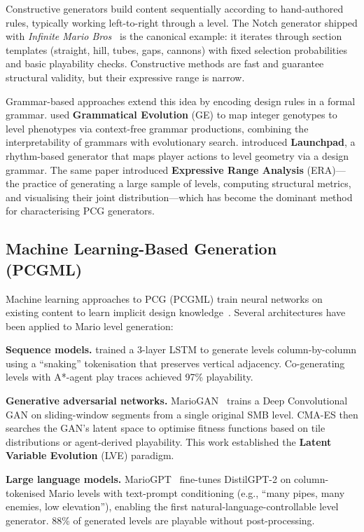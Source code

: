 \documentclass[shortabstract, mgr, english]{iithesis}
\begin{document}
Constructive generators build content sequentially according to hand-authored
rules, typically working left-to-right through a level. The Notch generator
shipped with \emph{Infinite Mario
Bros}~\citep{karakovskiy2012marioai} is the canonical example: it iterates
through section templates (straight, hill, tubes, gaps, cannons) with fixed
selection probabilities and basic playability checks. Constructive methods are
fast and guarantee structural validity, but their expressive range is narrow.

Grammar-based approaches extend this idea by encoding design rules in a formal
grammar. \citet{shaker2012evolving} used \textbf{Grammatical Evolution} (GE) to
map integer genotypes to level phenotypes via context-free grammar productions,
combining the interpretability of grammars with evolutionary search.
\citet{smith2010analyzing} introduced \textbf{Launchpad}, a rhythm-based
generator that maps player actions to level geometry via a design grammar. The
same paper introduced \textbf{Expressive Range Analysis} (ERA)---the practice of
generating a large sample of levels, computing structural metrics, and
visualising their joint distribution---which has become the dominant method for
characterising PCG generators.

\subsection{Machine Learning-Based Generation (PCGML)}
\label{subsec:bg-pcgml}

Machine learning approaches to PCG (PCGML) train neural networks on existing
content to learn implicit design knowledge~\citep{summerville2018pcgml}. Several
architectures have been applied to Mario level generation:

\textbf{Sequence models.} \citet{summerville2016super} trained a 3-layer LSTM to
generate levels column-by-column using a ``snaking'' tokenisation that preserves
vertical adjacency. Co-generating levels with A*-agent play traces achieved
97\% playability.

\textbf{Generative adversarial networks.} MarioGAN~\citep{volz2018evolving}
trains a Deep Convolutional GAN on sliding-window segments from a single
original SMB level. CMA-ES then searches the GAN's latent space to optimise
fitness functions based on tile distributions or agent-derived playability. This
work established the \textbf{Latent Variable Evolution} (LVE) paradigm.

\textbf{Large language models.} MarioGPT~\citep{sudhakaran2023mariogpt}
fine-tunes DistilGPT-2 on column-tokenised Mario levels with text-prompt
conditioning (e.g., ``many pipes, many enemies, low elevation''), enabling the
first natural-language-controllable level generator. 88\% of generated levels
are playable without post-processing.
\end{document}
